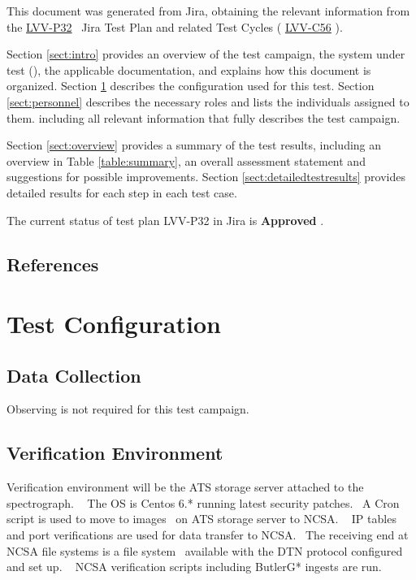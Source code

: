 \documentclass[DM,lsstdraft,STR,toc]{lsstdoc}
\begin{document}
This document was generated from Jira, obtaining the relevant information from the 
\href{https://jira.lsstcorp.org/secure/Tests.jspa#/testPlan/LVV-P32}{LVV-P32}
~Jira Test Plan and related Test Cycles (
  \href{https://jira.lsstcorp.org/secure/Tests.jspa#/testCycle/LVV-C56}{LVV-C56}
).

Section \ref{sect:intro} provides an overview of the test campaign, the system under test (\product{}),
the applicable documentation, and explains how this document is organized.
Section \ref{sect:configuration}  describes the configuration used for this test.
Section \ref{sect:personnel} describes the necessary roles and lists the individuals assigned to them.
including all relevant information that fully describes the test campaign.

Section \ref{sect:overview} provides a summary of the test results, including an overview in Table \ref{table:summary},
an overall assessment statement and suggestions for possible improvements.
Section \ref{sect:detailedtestresults} provides detailed results for each step in each test case.

The current status of test plan LVV-P32 in Jira is \textbf{ Approved }.

\subsection{References}
\label{sect:references}
\renewcommand{\refname}{}

\section{Test Configuration}
\label{sect:configuration}

\subsection{Data Collection}

  Observing is not required for this test campaign.

\subsection{Verification Environment}
\label{sect:hwconf}
  Verification environment will be the ATS storage server attached to the
spectrograph. ~ The OS is Centos 6.* running latest security patches. ~A
Cron script is used to move to images ~on ATS storage server to NCSA. ~
IP tables and port verifications are used for data transfer to NCSA.
~The receiving end at NCSA file systems is a file system ~available with
the DTN protocol configured and set up. ~ NCSA verification scripts
including ButlerG* ingests are run. ~\\[3\baselineskip]
\end{document}
